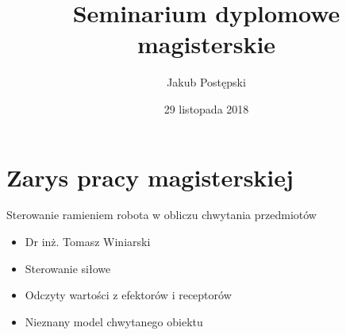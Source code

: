 \documentclass{beamer}
\begin{document}
\title{Seminarium dyplomowe magisterskie}
\author{Jakub Postępski}
\date{29 listopada 2018}

\frame{\titlepage}

\section{Zarys pracy magisterskiej}
\begin{frame}{Sterowanie ramieniem robota w obliczu chwytania przedmiotów}

\begin{itemize}
\item Dr inż. Tomasz Winiarski
\end{itemize}

\begin{itemize}
\item Sterowanie siłowe
\item Odczyty wartości z efektorów i receptorów
\item Nieznany model chwytanego obiektu
\end{itemize}
\end{frame}
\end{document}
